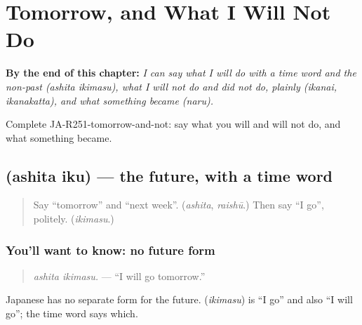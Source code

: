
\chapter{Tomorrow, and What I Will Not Do}
\label{ch:ja-tomorrow-and-what-i-will-not-do}

\begin{chapteropening}
\textbf{By the end of this chapter:} \emph{I can say what I will do with a time word and the non-past (ashita ikimasu), what I will not do and did not do, plainly (ikanai, ikanakatta), and what something became (naru).}

Complete JA-R251-tomorrow-and-not: say what you will and will not do, and what something became.
\end{chapteropening}

\section[\texorpdfstring{\ja{あした} \ja{いく} (ashita iku)}{あした いく (ashita iku)}]{  (ashita iku) — the future, with a time word}

\label{lesson:JA-C251-ashita-iku}



\begin{quote}
Say \textquotedblleft{}tomorrow\textquotedblright{} and \textquotedblleft{}next week\textquotedblright{}. (\emph{ashita}, \emph{raishū}.) Then say \textquotedblleft{}I go\textquotedblright{}, politely. (\emph{ikimasu}.)
\end{quote}

\subsection*{You'll want to know: no future form}
\begin{quote}
\textbf{ }
\end{quote}

\begin{quote}
\emph{ashita ikimasu.} — \textquotedblleft{}I will go tomorrow.\textquotedblright{}
\end{quote}

Japanese has no separate form for the future. \textbf{} (\emph{ikimasu}) is \textquotedblleft{}I go\textquotedblright{} and also \textquotedblleft{}I will go\textquotedblright{}; the time word says which.

